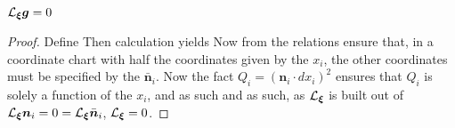 \documentclass{article}
\begin{document}
\begin{prop}
$\mathcal{L}_{\bm{\xi}} \bm{g} = 0$
\end{prop}
\begin{proof}
Define 
Then calculation yields 
Now from the relations 
ensure that, in a coordinate chart with half the coordinates given by the $x_i$, the other coordinates must be specified by the $\bar{\bm{n}}_i$. Now the fact $Q_i  = (\bm{n}_i \cdot dx_i)^2$ ensures that $Q_i$ is solely a function of the $x_i$, and as such 
and as such, as $\mathcal{L}_{\bm{\xi}}$ is built out of $\mathcal{L}_{\bm{\xi}}\bm{n}_i = 0 = \mathcal{L}_{\bm{\xi}}\bar{\bm{n}}_i$, $\mathcal{L}_{\bm{\xi}}=0$.
\end{proof}
\end{document}

